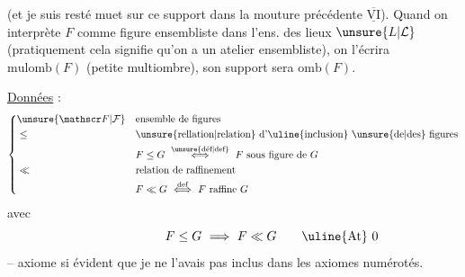 (et je suis resté muet sur ce support dans la mouture précédente  $\underline{\overline{\mathrm{VI}}}$). Quand on interprète $F$ comme figure ensembliste dans l'ens. des lieux $\unsure{L|\mathcal L}$  (pratiquement cela signifie qu'on a un atelier ensembliste), on l'écrira $\mathrm{mulomb}(F)$ (petite multiombre), son support sera $\mathrm{omb}(F)$.

\uline{Données} \uline{ } :
\[
\left\{\begin{aligned}
&\unsure{\mathscr F|\mathcal F} &&\text{ensemble de figures}\\
&\leq &&\text{\unsure{rellation|relation} d'\uline{inclusion} \unsure{de|des} figures}\\
& &&F\leq G\ \overset{\text{\unsure{déf|def}}}{\Longleftrightarrow}\ F\ \text{sous figure de }G\\
&\ll &&\text{relation de raffinement}\\
& && F\ll G\ \overset{\text{def}}{\Longleftrightarrow}\ F\ \text{raffine }G
\end{aligned}\right.
\]
avec
\[
F\leq G\ \Longrightarrow\ F\ll G\tag*{\makebox[0pt][r]{\makebox[\displaywidth][l]{\uline{At} 0}}}
\]
-- axiome si évident que je ne l'avais pas inclus dans les axiomes numérotés.


